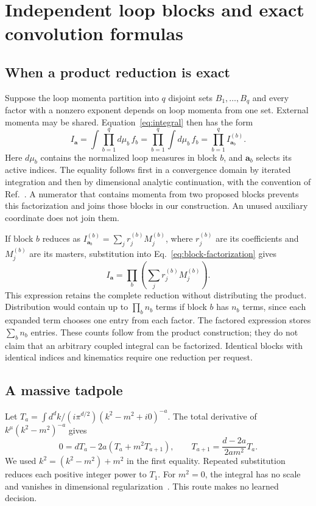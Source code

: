 \section{Independent loop blocks and exact convolution formulas}
\label{app:blocks13}
\subsection{When a product reduction is exact}
Suppose the loop momenta partition into $q$ disjoint sets $B_1,\ldots,B_q$ and every factor with a nonzero exponent depends on loop momenta from one set. External momenta may be shared. Equation~\eqref{eq:integral} then has the form
\begin{equation}
 I_{\boldsymbol a}=\int\prod_{b=1}^{q}d\mu_b\,f_b
 =\prod_{b=1}^{q}\int d\mu_b\,f_b
 =\prod_{b=1}^{q}I^{(b)}_{\boldsymbol a_b}.
 \label{eq:block-factorization}
\end{equation}
Here $d\mu_b$ contains the normalized loop measures in block $b$, and $\boldsymbol a_b$ selects its active indices. The equality follows first in a convergence domain by iterated integration and then by dimensional analytic continuation, with the convention of Ref.~\cite{Weinzierl2022}. A numerator that contains momenta from two proposed blocks prevents this factorization and joins those blocks in our construction. An unused auxiliary coordinate does not join them.

If block $b$ reduces as $I^{(b)}_{\boldsymbol a_b}=\sum_jr^{(b)}_jM^{(b)}_j$, where $r^{(b)}_j$ are its coefficients and $M^{(b)}_j$ are its masters, substitution into Eq.~\eqref{eq:block-factorization} gives
\begin{equation}
 I_{\boldsymbol a}=\prod_b\left(\sum_jr^{(b)}_jM^{(b)}_j\right).
 \label{eq:factored-expansion}
\end{equation}
This expression retains the complete reduction without distributing the product. Distribution would contain up to $\prod_b n_b$ terms if block $b$ has $n_b$ terms, since each expanded term chooses one entry from each factor. The factored expression stores $\sum_b n_b$ entries. These counts follow from the product construction; they do not claim that an arbitrary coupled integral can be factorized. Identical blocks with identical indices and kinematics require one reduction per request.

\subsection{A massive tadpole}
Let $T_a=\int d^dk/(i\pi^{d/2})(k^2-m^2+i0)^{-a}$. The total derivative of $k^\mu(k^2-m^2)^{-a}$ gives
\begin{equation}
 0=dT_a-2a(T_a+m^2T_{a+1}),\qquad
 T_{a+1}=\frac{d-2a}{2am^2}T_a.
 \label{eq:tadpole13}
\end{equation}
We used $k^2=(k^2-m^2)+m^2$ in the first equality. Repeated substitution reduces each positive integer power to $T_1$. For $m^2=0$, the integral has no scale and vanishes in dimensional regularization~\cite{Weinzierl2022}. This route makes no learned decision.


